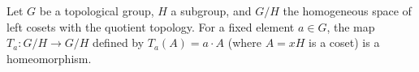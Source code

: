 Let $G$ be a topological group, $H$ a subgroup, and $G/H$ the homogeneous space of left cosets with the quotient topology. For a fixed element $a \in G$, the map $T_a: G/H \to G/H$ defined by $T_a(A) = a \cdot A$ (where $A = xH$ is a coset) is a homeomorphism.
